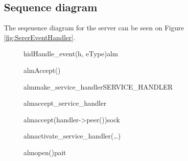 \documentclass[Main]{subfiles}
\begin{document}
\subsection{Sequence diagram}
The seqeuence diagram for the server can be seen on Figure \ref{fig:SererEventHandler}.
\newpage
\begin{figure}[htbp]
\begin {sequencediagram}


	\begin{messcall}{hid}{Handle\_event(h, eType)}{alm}

		\begin{callself}{alm}{Accept()}{}
			\begin{callself}{alm}{make\_service\_handler}{SERVICE\_HANDLER}
			\end{callself}

			\begin{callself}{alm}{accept\_service\_handler}{}
				\begin{call}{alm}{accept(handler->peer())}{sock}{}
				\end{call}
			\end{callself}

			\begin{callself}{alm}{activate\_service\_handler(\dots)}{}
				\begin{call}{alm}{open()}{pait}{}
				\end{call}
			\end{callself}
		\end{callself}







\end{messcall}
\end{sequencediagram}
\end{figure}
\end{document}

